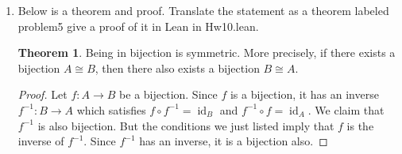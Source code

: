 \documentclass[12pt]{amsart}
\theoremstyle{definition}
\newtheorem*{theorem*}{Theorem}
\begin{document}
\begin{enumerate}
	\item Below is a theorem and proof. Translate the statement as a 
		theorem labeled problem5 give a proof of it in Lean in Hw10.lean.

	\begin{theorem*}
		Being in bijection is symmetric. More precisely, if there exists a bijection 
		$A \cong B$, then there also exists a bijection $B \cong A$. 
	\end{theorem*}
	
	\begin{proof}
		Let $f : A \to B$ be a bijection. Since $f$ is a bijection, it has 
		an inverse $f^{-1} : B \to A$ which satisfies $f \circ f^{-1} = 
		\operatorname{id}_B$ and $f^{-1} \circ f = \operatorname{id}_A$. We 
		claim that $f^{-1}$ is also bijection. But the conditions we just 
		listed imply that $f$ is the inverse of $f^{-1}$. Since $f^{-1}$ 
		has an inverse, it is a bijection also. 
	\end{proof}
		
\end{enumerate}
\end{document}
